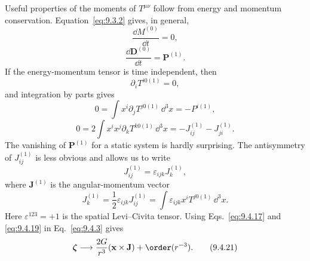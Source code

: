 Useful properties of the moments of \(T^{\mu\nu}\) follow from energy and
momentum conservation. Equation~\eqref{eq:9.3.2} gives, in general,
\begin{equation}
  \frac{\dd M^{(0)}}{\dd t}=0,
  \tag{9.4.15}\label{eq:9.4.15}
\end{equation}
\begin{equation}
  \frac{\dd\mathbf D^{(0)}}{\dd t}=\mathbf P^{(1)}.
  \tag{9.4.16}\label{eq:9.4.16}
\end{equation}
If the energy-momentum tensor is time independent, then
\[
  \partial_iT^{i0(1)}=0,
\]
and integration by parts gives
\begin{equation}
  0
  =
  \int x^i\partial_jT^{j0(1)}\,\dd^3x
  =
  -P^{i(1)},
  \tag{9.4.17}\label{eq:9.4.17}
\end{equation}
\begin{equation}
  0
  =
  2\int x^ix^j\partial_kT^{k0(1)}\,\dd^3x
  =
  -J_{ij}^{(1)}-J_{ji}^{(1)}.
  \tag{9.4.18}\label{eq:9.4.18}
\end{equation}
The vanishing of \(\mathbf P^{(1)}\) for a static system is hardly
surprising. The antisymmetry of \(J_{ij}^{(1)}\) is less obvious and allows
us to write
\begin{equation}
  J_{ij}^{(1)}=\varepsilon_{ijk}J_k^{(1)},
  \tag{9.4.19}\label{eq:9.4.19}
\end{equation}
where \(\mathbf J^{(1)}\) is the angular-momentum vector
\begin{equation}
  J_k^{(1)}
  =
  \frac12\varepsilon_{ijk}J_{ij}^{(1)}
  =
  \int\varepsilon_{ijk}x^iT^{j0(1)}\,\dd^3x.
  \tag{9.4.20}\label{eq:9.4.20}
\end{equation}
Here \(\varepsilon^{123}=+1\) is the spatial Levi--Civita tensor. Using
Eqs.~\eqref{eq:9.4.17} and \eqref{eq:9.4.19} in
Eq.~\eqref{eq:9.4.3} gives
\begin{equation}
  \boldsymbol\zeta
  \longrightarrow
  \frac{2G}{r^3}(\mathbf x\times\mathbf J)
  +\order(r^{-3}).
  \tag{9.4.21}\label{eq:9.4.21}
\end{equation}

